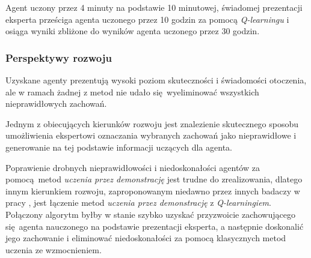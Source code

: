 Agent uczony przez 4 minuty na podstawie 10 minutowej, świadomej prezentacji eksperta prześciga agenta uczonego przez 10 godzin za pomocą \textit{Q-learningu} i osiąga wyniki zbliżone do wyników agenta uczonego przez 30 godzin.

\subsubsection{Perspektywy rozwoju}

Uzyskane agenty prezentują wysoki poziom skuteczności i świadomości otoczenia, ale w ramach żadnej z metod nie udało się wyeliminować wszystkich nieprawidłowych zachowań.

Jednym z obiecujących kierunków rozwoju jest znalezienie skutecznego sposobu umożliwienia ekspertowi oznaczania wybranych zachowań jako nieprawidłowe i generowanie na tej podstawie informacji uczących dla agenta.

Poprawienie drobnych nieprawidłowości i niedoskonałości agentów za pomocą metod \textit{uczenia przez demonstrację} jest trudne do zrealizowania, dlatego innym kierunkiem rozwoju, zaproponowanym niedawno przez innych badaczy w pracy \cite{DBLP:journals/corr/HesterVPLSPSDOA17}, jest łączenie metod \textit{uczenia przez demonstrację} z \textit{Q-learningiem}. Połączony algorytm byłby w stanie szybko uzyskać przyzwoicie zachowującego się agenta nauczonego na podstawie prezentacji eksperta, a następnie doskonalić jego zachowanie i eliminować niedoskonałości za pomocą klasycznych metod uczenia ze wzmocnieniem.



